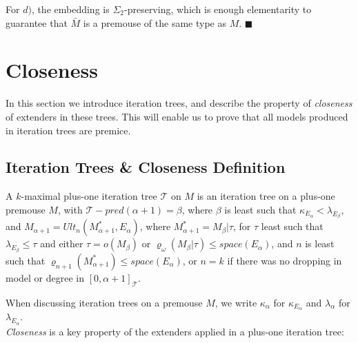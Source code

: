 \documentclass[12pt]{article}
\begin{document}
For $d)$, the embedding is $\Sigma_2$-preserving, which is enough elementarity to guarantee that $\bar{M}$ is a premouse of the same type as $M$.  $\blacksquare$\\











\section{Closeness}






In this section we introduce iteration trees, and describe the property of \textit{closeness} of extenders in these trees.  This will enable us to prove that all models produced in iteration trees are premice.\\

\subsection{Iteration Trees \& Closeness Definition}

\begin{def} \label{iteration tree}
A $k$-maximal plus-one iteration tree $\mathscr{T}$ on $M$ is an iteration tree on a plus-one premouse $M$, with $\mathscr{T}-pred (\alpha +1) = \beta$, where $\beta$ is least such that $\kappa_{E_\alpha} < \lambda_{E_\beta} $, and $M_{\alpha + 1 } = Ult_n (M_{\alpha +1}^*, E_\alpha)$, where $M_{\alpha +1}^* = M_\beta | \tau$, for $\tau$ least such that $\lambda_{E_\beta} \leq \tau$ and either $\tau = o(M_\beta )$ or $\varrho_\omega (M_\beta | \tau ) \leq space(E_\alpha)$, and $n$ is least such that $\varrho_{n+1} (M_{\alpha +1}^* ) \leq space (E_\alpha )$, or $n = k$ if there was no dropping in model or degree in $[0, \alpha + 1]_\mathscr{T}$.
\end{def}

When discussing iteration trees on a premouse $M$, we write $\kappa_\alpha$ for $\kappa_{E_\alpha}$ and $\lambda_\alpha$ for $\lambda_{E_\alpha}$.\\


\textit{Closeness} is a key property of the extenders applied in a plus-one iteration tree:\\
\end{document}
